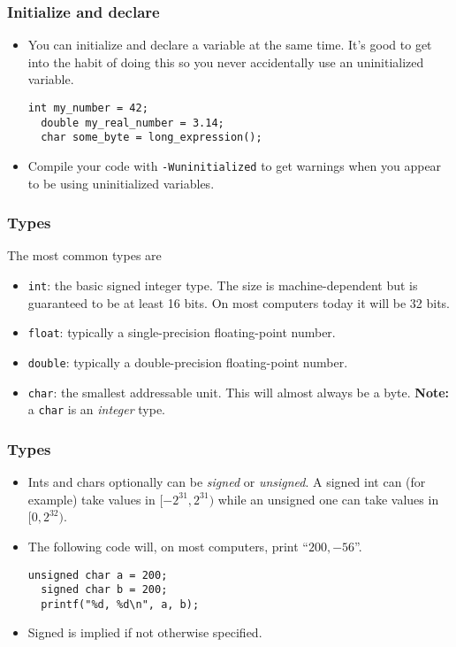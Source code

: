 \begin{frame}[fragile]
  \frametitle{Initialize and declare}
  \begin{itemize}
  \item You can initialize and declare a variable at the same time. It's good to
    get into the habit of doing this so you never accidentally use an
    uninitialized variable.
\begin{lstlisting}[style=c]
  int my_number = 42;
  double my_real_number = 3.14;
  char some_byte = long_expression();
\end{lstlisting}
  \item Compile your code with \texttt{-Wuninitialized} to get warnings when you
    appear to be using uninitialized variables.
  \end{itemize}
\end{frame}

\begin{frame}
  \frametitle{Types}
  The most common types are
  \begin{itemize}
  \item \texttt{int}: the basic signed integer type. The size is
    machine-dependent but is guaranteed to be at least 16 bits. On most
    computers today it will be 32 bits.
  \item \texttt{float}: typically a single-precision floating-point number.
  \item \texttt{double}: typically a double-precision floating-point number.
  \item \texttt{char}: the smallest addressable unit. This will almost always be
    a byte. \textbf{Note:} a \texttt{char} is an \emph{integer} type.
  \end{itemize}
\end{frame}

\begin{frame}[fragile]
  \frametitle{Types}
  \begin{itemize}
  \item Ints and chars optionally can be \emph{signed} or \emph{unsigned}. A
    signed int can (for example) take values in $[-2^{31}, 2^{31})$ while an
    unsigned one can take values in $[0,2^{32})$.
  \item The following code will, on most computers, print ``$200, -56$''.
\begin{lstlisting}[style=c]
  unsigned char a = 200;
  signed char b = 200;
  printf("%d, %d\n", a, b);
\end{lstlisting}
  \item Signed is implied if not otherwise specified.
  \end{itemize}
\end{frame}

